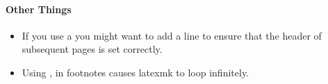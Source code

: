 \paragraph{Other Things}

\begin{itemize}
 	\item If you use a  you might want to add a line  to ensure that the header of subsequent pages is set correctly. 
	\item Using \detokenize{\left}, \detokenize{\right} in footnotes causes latexmk to loop infinitely. 
\end{itemize}




